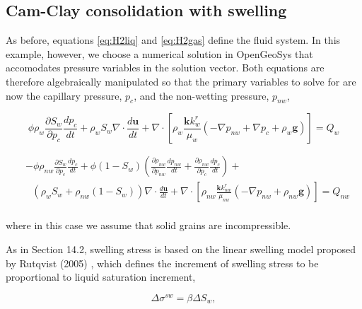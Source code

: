 \subsection{Cam-Clay consolidation with swelling}
As before, equations \ref{eq:H2liq} and \ref{eq:H2gas} define the fluid system. In this example, however, we choose a numerical solution in OpenGeoSys that accomodates pressure variables in the solution vector. Both equations are therefore algebraically manipulated so that the primary variables to solve for are now the capillary pressure, $p_c$, and the non-wetting pressure, $p_{nw}$,

\begin{equation}
\phi {{\rho }_{w}}\frac{\partial {{S}_{w}}}{\partial {{p}_{c}}}\frac{d{{p}_{c}}}{dt}+{{\rho }_{w}}{{S}_{w}}\nabla \cdot \frac{d\mathbf{u}}{dt}+\nabla \cdot \left[ {{\rho }_{w}}\frac{\mathbf{k}k_{w}^{r}}{{{\mu }_{w}}}\left( -\nabla {{p}_{nw}}+\nabla {{p}_{c}}+{{\rho }_{w}}\mathbf{g} \right) \right]={{Q}_{w}}
\end{equation}

\begin{equation}
\begin{split}
  & -\phi {{\rho }_{nw}}\frac{\partial {{S}_{w}}}{\partial {{p}_{c}}}\frac{d{{p}_{c}}}{dt}+\phi \left( 1-{{S}_{w}} \right)\left( \frac{\partial {{\rho }_{nw}}}{\partial {{p}_{nw}}}\frac{d{{p}_{nw}}}{dt}+\frac{\partial {{\rho }_{nw}}}{\partial {{p}_{c}}}\frac{d{{p}_{c}}}{dt} \right)+ \\ 
 & \text{          }\left( {{\rho }_{w}}{{S}_{w}}+{{\rho }_{nw}}\left( 1-{{S}_{w}} \right) \right)\nabla \cdot \frac{d\mathbf{u}}{dt}+\nabla \cdot \left[ {{\rho }_{nw}}\frac{\mathbf{k}k_{nw}^{r}}{{{\mu }_{nw}}}\left( -\nabla {{p}_{nw}}+{{\rho }_{nw}}\mathbf{g} \right) \right]={{Q}_{nw}} \\ 
\end{split}
\end{equation}

where in this case we assume that solid grains are incompressible. 

As in Section 14.2, swelling stress is based on the linear swelling model proposed by Rutqvist (2005) \cite{Jonny05}, which defines the increment of swelling stress to be proportional to liquid saturation increment,

\begin{equation}
\Delta \sigma ^{sw}=\beta \Delta S_w,
\end{equation}

